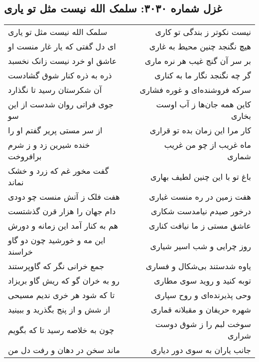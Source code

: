 \begin{center}
\section*{غزل شماره ۳۰۳۰: سلمک الله نیست مثل تو یاری}
\label{sec:3030}
\begin{longtable}{l p{0.5cm} r}
سلمک الله نیست مثل تو یاری
&&
نیست نکوتر ز بندگی تو کاری
\\
ای دل گفتی که یار غار منست او
&&
هیچ نگنجد چنین محیط به غاری
\\
عاشق او خرد نیست زانک نخسبد
&&
بر سر آن گنج غیب هر نره ماری
\\
ذره به ذره کنار شوق گشادست
&&
گر چه نگنجد نگار ما به کناری
\\
آن شکرستان رسید تا نگذارد
&&
سرکه فروشنده‌ای و غوره فشاری
\\
جوی فراتی روان شدست از این سو
&&
کاین همه جان‌ها ز آب اوست بخاری
\\
از سر مستی پریر گفتم او را
&&
کار مرا این زمان بده تو قراری
\\
خنده شیرین زد و ز شرم برافروخت
&&
ماه غریب از چو من غریب شماری
\\
گفت مخور غم که زرد و خشک نماند
&&
باغ تو با این چنین لطیف بهاری
\\
هفت فلک ز آتش منست چو دودی
&&
هفت زمین در ره منست غباری
\\
دام جهان را هزار قرن گذشتست
&&
درخور صیدم نیامدست شکاری
\\
هم به کنار آمد این زمانه و دورش
&&
عاشق مستی ز ما نیافت کناری
\\
این مه و خورشید چون دو گاو خراسند
&&
روز چرایی و شب اسیر شیاری
\\
جمع خرانی نگر که گاوپرستند
&&
یاوه شدستند بی‌شکال و فساری
\\
رو به خران گو که ریش گاو بریزاد
&&
توبه کنید و روید سوی مطاری
\\
تا که شود هر خری ندیم مسیحی
&&
وحی پذیرنده‌ای و روح سپاری
\\
از شش و از پنج بگذرید و ببینید
&&
شهره حریفان و مقبلانه قماری
\\
چون به خلاصه رسید تا که بگویم
&&
سوخت لبم را ز شوق دوست شراری
\\
ماند سخن در دهان و رفت دل من
&&
جانب یاران به سوی دور دیاری
\\
\end{longtable}
\end{center}

